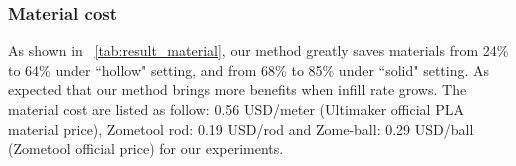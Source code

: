 
\subsubsection{Material cost}
As shown in \tabname~\ref{tab:result_material}, our method greatly saves materials from 24\% to 64\% under ``hollow" setting, and from 68\% to 85\% under ``solid" setting.
As expected that our method brings more benefits when infill rate grows.
The material cost are listed as follow: 0.56 USD/meter (Ultimaker official PLA material price), Zometool rod: 0.19 USD/rod and Zome-ball: 0.29 USD/ball (Zometool official price) for our experiments. 

